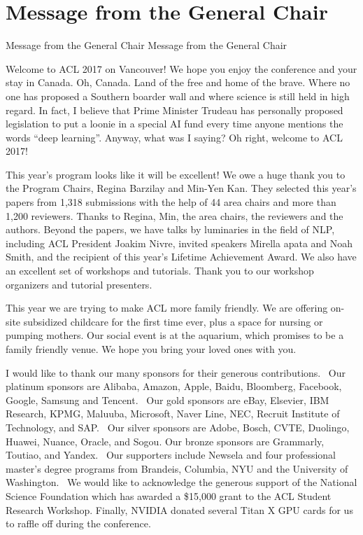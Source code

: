 \section{Message from the General Chair}\vspace{2em}
\setheaders%
    {Message from the General Chair}%
    {Message from the General Chair}
\thispagestyle{emptyheader}

\setlength{\parskip}{1ex}

Welcome to ACL 2017 on Vancouver!  We hope you enjoy the conference and your
stay in Canada. Oh, Canada. Land of the free and home of the brave. Where no
one has proposed a Southern boarder wall and where science is still held in
high regard.  In fact, I believe that Prime Minister Trudeau has personally
proposed legislation to put a loonie in a special AI fund every time anyone
mentions the words ``deep learning''.  Anyway, what was I saying? Oh right,
welcome to ACL 2017!

This year's program looks like it will be excellent!  We owe a huge thank you
to the Program Chairs, Regina Barzilay and Min-Yen Kan.  They selected this
year's papers from 1,318 submissions with the help of 44 area chairs and more
than 1,200 reviewers. Thanks to Regina, Min, the area chairs, the reviewers
and the authors. Beyond the papers, we have talks by luminaries in the field
of NLP, including ACL President Joakim Nivre, invited speakers Mirella 
apata and Noah Smith, and the recipient of this year's Lifetime Achievement
Award.  We also have an excellent set of workshops and tutorials. Thank you to
our workshop organizers and tutorial presenters.

This year we are trying to make ACL more family friendly. We are offering
on-site subsidized childcare for the first time ever, plus a space for nursing
or pumping mothers. Our social event is at the aquarium, which promises to be
a family friendly venue. We hope you bring your loved ones with you.

I would like to thank our many sponsors for their generous contributions.  
Our platinum sponsors are 
Alibaba, 
Amazon, 
Apple, 
Baidu, 
Bloomberg, 
Facebook, 
Google, 
Samsung and 
Tencent.  
Our gold sponsors are 
eBay, 
Elsevier, 
IBM Research, 
KPMG, 
Maluuba, 
Microsoft, 
Naver Line, 
NEC,
Recruit Institute of Technology, and 
SAP.  
Our silver sponsors are 
Adobe,
Bosch,
CVTE,
Duolingo,
Huawei,
Nuance,
Oracle, and
Sogou.
Our bronze sponsors are 
Grammarly, 
Toutiao, and 
Yandex.  
Our supporters include 
Newsela 
and four professional master’s degree programs from 
Brandeis, 
Columbia, 
NYU and 
the University of Washington.  
We would like to acknowledge the generous support of the National Science Foundation which has awarded a \$15,000 grant to the ACL Student Research Workshop.
Finally, NVIDIA donated several Titan X GPU cards for us to raffle off during the conference. 

